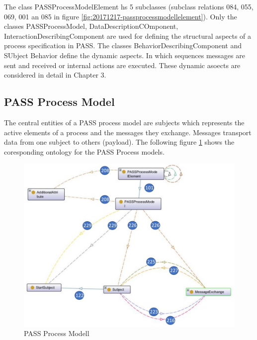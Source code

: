 The class PASSProcessModelElement hs 5 subclasses (subclass relations 084, 055, 069, 001 an 085 in figure \ref{fig:20171217-passprocessmodellelement}). Only the classes PASSProcessModel, DataDescriptionCOmponent, InteractionDescribingComponent are used for defining the structural aspects of a process specification in PASS. The classes BehaviorDescribingComponent and SUbject Behavior define the dynamic aspects. In which sequences messages are sent and received or internal actions are executed. These dynamic asoects are considered in detail in Chapter 3. 



\subsection{PASS Process Model}
The central entities of a PASS process model are subjects which represents the active elements of a process and the messages they exchange. Messages transport data from one subject to others (payload). The following figure \ref{fig:20181217-passprocessmodel} shows the coresponding ontology for the PASS Process models.

\begin{figure}[ph]
	\centering
	\includegraphics[width=1.0\linewidth]{20181026-Ontologie-Bilder/Grafiken-Ontologie/SUbject-Interaction/20181217-PASSProcessModel}
	\caption[PASS Process Modell]{PASS Process Modell}
	\label{fig:20181217-passprocessmodel}
\end{figure}

